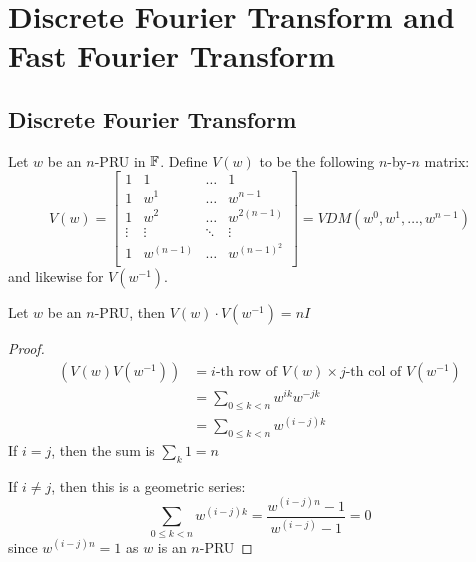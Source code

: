 
\section{Discrete Fourier Transform and Fast Fourier Transform}

\subsection{Discrete Fourier Transform}

\begin{definition}{}{}
    Let $w$ be an $n$-PRU in $\operatorname{\mathbb{F}}$.
    Define $V(w)$ to be the following $n$-by-$n$ matrix:
    \begin{equation}
        V(w) = 
        \begin{bmatrix}
            1 & 1 & \ldots & 1 \\    
            1 & w^1 & \ldots & w^{n-1} \\    
            1 & w^2 & \ldots & w^{2(n-1)} \\    
            \vdots & \vdots & \ddots & \vdots \\    
            1 & w^{(n-1)} & \ldots & w^{(n-1)^2} \\    
        \end{bmatrix}
        =
        VDM(w^0, w^1, \ldots, w^{n-1})
    \end{equation}
    and likewise for $V(w^{-1})$.
\end{definition}

\begin{theorem}{}{}
    Let $w$ be an $n$-PRU, then $V(w)\cdot V(w^{-1}) = nI$
\end{theorem}
\begin{proof}
    \begin{align*}
        \left(V(w)V(w^{-1})\right) &= i\text{-th row of }V(w) \times j\text{-th col of }V(w^{-1}) \\
        &= \sum_{0 \leq k < n} w^{ik}w^{-jk} \\ 
        &= \sum_{0 \leq k < n} w^{(i - j)k}
    \end{align*}
    If $i = j$, then the sum is $\sum_k 1 = n$

    If $i \neq j$, then this is a geometric series:
    \begin{equation*}
        \sum_{0 \leq k < n} w^{(i - j)k} = \frac{w^{(i-j)n} - 1}{w^{(i - j)} - 1} = 0
    \end{equation*}
    since $w^{(i - j)n} = 1$ as $w$ is an $n$-PRU
\end{proof}

